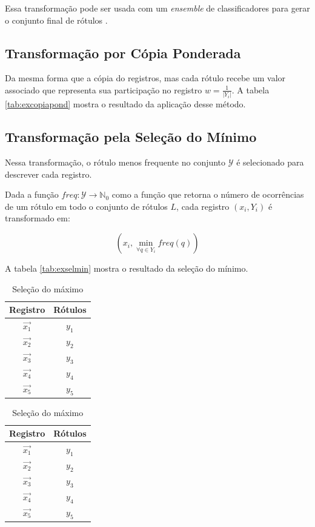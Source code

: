 \documentclass[runningheads,a4paper]{llncs}
\begin{document}
Essa transformação pode ser usada com um \textit{ensemble} de classificadores para gerar o conjunto final de rótulos \cite{Joachims1998-zz} \cite{Yang1999-ah}.

\subsection{Transformação por Cópia Ponderada} \label{subsec:copiaponderada}

Da mesma forma que a cópia do registros, mas cada rótulo recebe um valor associado que representa sua participação no registro $w = \frac{1}{|Y_i|}$. A tabela \ref{tab:excopiapond} mostra o resultado da aplicação desse método.

\subsection{Transformação pela Seleção do Mínimo} \label{subsec:selecaominimo}

Nessa transformação, o rótulo menos frequente no conjunto $\mathcal{Y}$ é selecionado para descrever cada registro.

Dada a função $freq : \mathcal{Y} \to \mathbb{N}_0$ como a função que retorna o número de ocorrências de um rótulo em todo o conjunto de rótulos $L$, cada registro $(x_i, Y_i)$ é transformado em:

$$(x_i, \min_{\forall q \in Y_i} freq(q))$$

A tabela \ref{tab:exselmin} mostra o resultado da seleção do mínimo.

\begin{table}
\parbox{.45\linewidth} {
	\centering
	\begin{tabular}{| c | c |}
		\hline
		\textbf{Registro} & \textbf{Rótulos} \\
		\hline
		$\vec{x_1}$ & $y_1$ \\
		\hline
		$\vec{x_2}$ & $y_2$ \\
		\hline
		$\vec{x_3}$ & $y_3$ \\
		\hline
		$\vec{x_4}$ & $y_4$ \\
		\hline
		$\vec{x_5}$ & $y_5$ \\
		\hline
	\end{tabular}
	\caption{Seleção do mínimo}
	\label{tab:exselmin}
}
\parbox{.45\linewidth}{
	\centering
	\begin{tabular}{| c | c |}
		\hline
		\textbf{Registro} & \textbf{Rótulos} \\
		\hline
		$\vec{x_1}$ & $y_1$ \\
		\hline
		$\vec{x_2}$ & $y_2$ \\
		\hline
		$\vec{x_3}$ & $y_3$ \\
		\hline
		$\vec{x_4}$ & $y_4$ \\
		\hline
		$\vec{x_5}$ & $y_5$ \\
		\hline
	\end{tabular}
	\caption{Seleção do máximo}
	\label{tab:exselmax}
}
\end{table}
\end{document}
